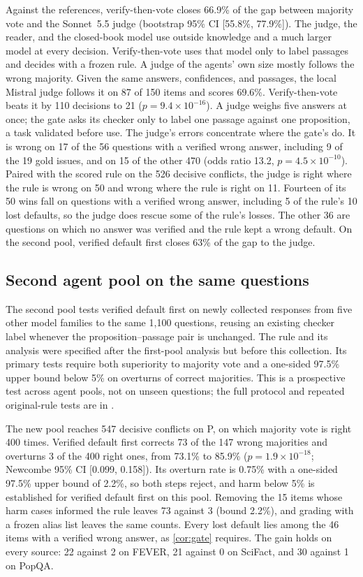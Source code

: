 Against the references, verify-then-vote closes 66.9\% of the gap between majority vote and the Sonnet~5.5 judge (bootstrap 95\% CI [55.8\%, 77.9\%]). The judge, the reader, and the closed-book model use outside knowledge and a much larger model at every decision. Verify-then-vote uses that model only to label passages and decides with a frozen rule. A judge of the agents' own size mostly follows the wrong majority. Given the same answers, confidences, and passages, the local Mistral judge follows it on 87 of 150 items and scores 69.6\%. Verify-then-vote beats it by 110 decisions to 21 ($p = 9.4 \times 10^{-16}$). A judge weighs five answers at once; the gate asks its checker only to label one passage against one proposition, a task validated before use. The judge's errors concentrate where the gate's do. It is wrong on 17 of the 56 questions with a verified wrong answer, including 9 of the 19 gold issues, and on 15 of the other 470 (odds ratio 13.2, $p = 4.5 \times 10^{-10}$). Paired with the scored rule on the 526 decisive conflicts, the judge is right where the rule is wrong on 50 and wrong where the rule is right on 11. Fourteen of its 50 wins fall on questions with a verified wrong answer, including 5 of the rule's 10 lost defaults, so the judge does rescue some of the rule's losses. The other 36 are questions on which no answer was verified and the rule kept a wrong default. On the second pool, verified default first closes 63\% of the gap to the judge.

\subsection{Second agent pool on the same questions}
\label{sec:replication}

The second pool tests verified default first on newly collected responses from five other model families to the same 1,100 questions, reusing an existing checker label whenever the proposition--passage pair is unchanged. The rule and its analysis were specified after the first-pool analysis but before this collection. Its primary tests require both superiority to majority vote and a one-sided 97.5\% upper bound below 5\% on overturns of correct majorities. This is a prospective test across agent pools, not on unseen questions; the full protocol and repeated original-rule tests are in .

The new pool reaches 547 decisive conflicts on P, on which majority vote is right 400 times. Verified default first corrects 73 of the 147 wrong majorities and overturns 3 of the 400 right ones, from 73.1\% to 85.9\% ($p = 1.9 \times 10^{-18}$; Newcombe 95\% CI [0.099, 0.158]). Its overturn rate is 0.75\% with a one-sided 97.5\% upper bound of 2.2\%, so both steps reject, and harm below 5\% is established for verified default first on this pool. Removing the 15 items whose harm cases informed the rule leaves 73 against 3 (bound 2.2\%), and grading with a frozen alias list leaves the same counts. Every lost default lies among the 46 items with a verified wrong answer, as \cref{cor:gate} requires. The gain holds on every source: 22 against 2 on FEVER, 21 against 0 on SciFact, and 30 against 1 on PopQA.

